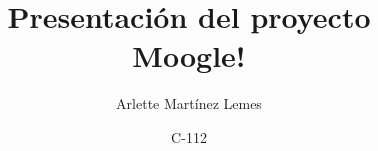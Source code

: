 \documentclass{beamer}
\begin{document}
    
\title{Presentación del proyecto \\Moogle!}
\subtitle{}
\author{Arlette Martínez Lemes}
\date{C-112}
\maketitle





\end{document}
